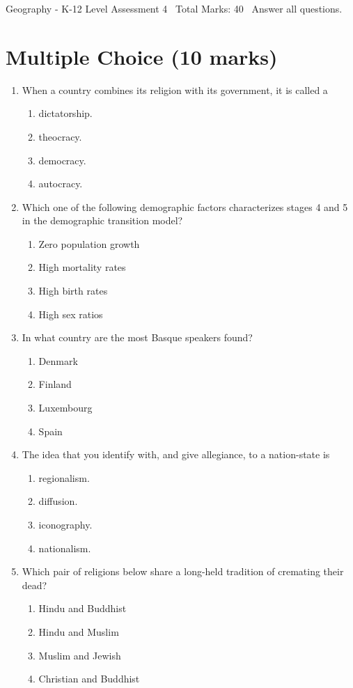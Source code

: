 \documentclass[12pt]{article}
\begin{document}
\begin{center}
Geography - K-12 Level Assessment 4 \
Total Marks: 40 \
Answer all questions.
\end{center}

\section*{Multiple Choice (10 marks)}
\begin{enumerate}[label=\arabic*.]
\item When a country combines its religion with its government, it is called a
\begin{enumerate}[label=(\alph*)]
    \item dictatorship.
    \item theocracy.
    \item democracy.
    \item autocracy.
\end{enumerate}
\item Which one of the following demographic factors characterizes stages 4 and 5 in the demographic transition model?
\begin{enumerate}[label=(\alph*)]
    \item Zero population growth
    \item High mortality rates
    \item High birth rates
    \item High sex ratios
\end{enumerate}
\item In what country are the most Basque speakers found?
\begin{enumerate}[label=(\alph*)]
    \item Denmark
    \item Finland
    \item Luxembourg
    \item Spain
\end{enumerate}
\item The idea that you identify with, and give allegiance, to a nation-state is
\begin{enumerate}[label=(\alph*)]
    \item regionalism.
    \item diffusion.
    \item iconography.
    \item nationalism.
\end{enumerate}
\item Which pair of religions below share a long-held tradition of cremating their dead?
\begin{enumerate}[label=(\alph*)]
    \item Hindu and Buddhist
    \item Hindu and Muslim
    \item Muslim and Jewish
    \item Christian and Buddhist
\end{enumerate}
\end{enumerate}
\end{document}
